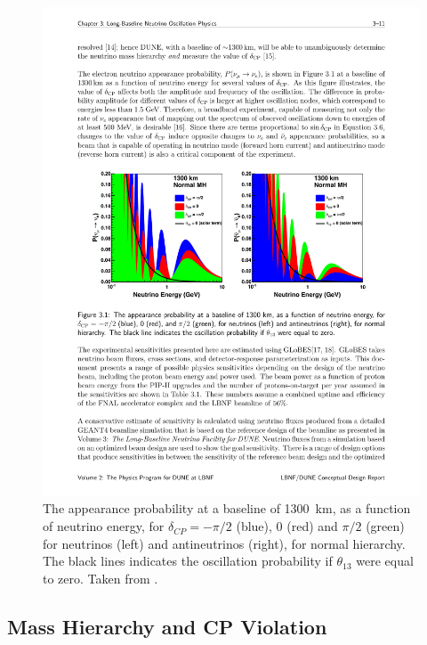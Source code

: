 \begin{figure}
  \centering
  \includegraphics[width=16cm]{DUNEAppearanceProbabilities.pdf}
  \caption[The appearance probability at a baseline of 1300~km, as a function of neutrino energy, for $\delta_{CP}=-\pi/2$, 0 and $\pi/2$, neutrinos and antineutrinos, assuming normal hierarchy.]{The appearance probability at a baseline of 1300~km, as a function of neutrino energy, for $\delta_{CP}=-\pi/2$ (blue), 0 (red) and $\pi/2$ (green) for neutrinos (left) and antineutrinos (right), for normal hierarchy.  The black lines indicates the oscillation probability if $\theta_{13}$ were equal to zero.  Taken from \cite{DUNECDR2}.}
  \label{fig:DUNEAppearanceProbabilities}
\end{figure}

\subsection{Mass Hierarchy and CP Violation}\label{sec:DUNEMassHierarchyCPViolation}

